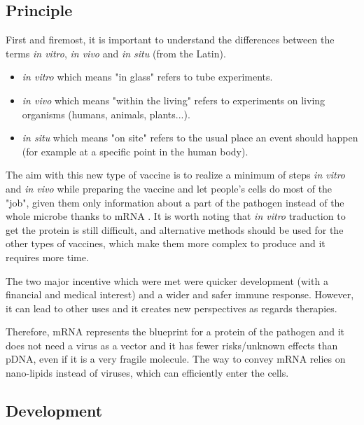 \documentclass{article}
\begin{document}
        \subsection{Principle}

                First and firemost, it is important to understand the differences between the terms \emph{in vitro}, \emph{in vivo} and \emph{in situ} (from the Latin).
                \begin{itemize}
                    \item \emph{in vitro} which means "in glass" refers to tube experiments.
                    \item \emph{in vivo} which means "within the living" refers to experiments on living organisms (humans, animals, plants...).
                    \item \emph{in situ} which means "on site" refers to the usual place an event should happen (for example at a specific point in the human body).
                \end{itemize}
                The aim with this new type of vaccine is to realize a minimum of steps \emph{in vitro} and \emph{in vivo} while preparing the vaccine and
                    let people's cells do most of the "job", given them only information about a part of the pathogen instead of the whole microbe thanks
                    to mRNA \autocite{maruggiMRNATransformativeTechnology2019}.         
                It is worth noting that \emph{in vitro} traduction to get the protein is still difficult, and alternative methods should be used for the other
                    types of vaccines, which make them more complex to produce and it requires more time.

                The two major incentive which were met were quicker development (with a financial and medical interest) and a wider and safer immune response.
                However, it can lead to other uses and it creates new perspectives as regards therapies.

                Therefore, mRNA represents the blueprint for a protein of the pathogen and it does not need a virus as a vector
                    and it has fewer risks/unknown effects than pDNA, even if it is a very fragile molecule.
                The way to convey mRNA relies on nano-lipids instead of viruses, which can efficiently enter the cells.


        \subsection{Development}
\end{document}
